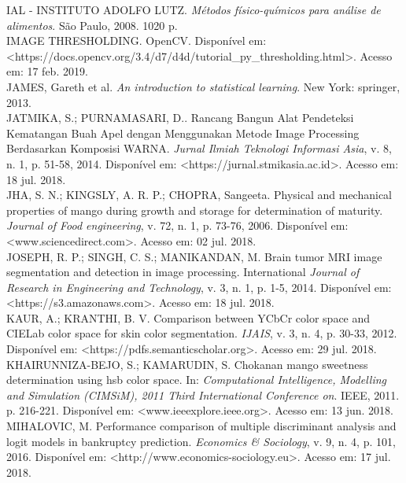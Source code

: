 \noindent IAL - INSTITUTO ADOLFO LUTZ. \textit{Métodos físico-químicos para análise de alimentos}. São Paulo, 2008. 1020 p.
\\

\noindent IMAGE THRESHOLDING. OpenCV. Disponível em: <https://docs.opencv.org/3.4/d7/d4d/tutorial\_py\_thresholding.html>. Acesso em: 17 feb. 2019.
\\

\noindent JAMES, Gareth et al. \textit{An introduction to statistical learning}. New York: springer, 2013.
\\

\noindent JATMIKA, S.; PURNAMASARI, D.. Rancang Bangun Alat Pendeteksi Kematangan Buah Apel dengan Menggunakan Metode Image Processing Berdasarkan Komposisi WARNA. \textit{Jurnal Ilmiah Teknologi Informasi Asia}, v. 8, n. 1, p. 51-58, 2014. Disponível em: <https://jurnal.stmikasia.ac.id>. Acesso em: 18 jul. 2018.
\\

\noindent JHA, S. N.; KINGSLY, A. R. P.; CHOPRA, Sangeeta. Physical and mechanical properties of mango during growth and storage for determination of maturity. \textit{Journal of Food engineering}, v. 72, n. 1, p. 73-76, 2006. Disponível em: <www.sciencedirect.com>. Acesso em: 02 jul. 2018.
\\

\noindent JOSEPH, R. P.; SINGH, C. S.; MANIKANDAN, M. Brain tumor MRI image segmentation and detection in image processing. International \textit{Journal of Research in Engineering and Technology}, v. 3, n. 1, p. 1-5, 2014. Disponível em: <https://s3.amazonaws.com>. Acesso em: 18 jul. 2018.
\\

\noindent KAUR, A.; KRANTHI, B. V. Comparison between YCbCr color space and CIELab color space for skin color segmentation. \textit{IJAIS}, v. 3, n. 4, p. 30-33, 2012. Disponível em: <https://pdfs.semanticscholar.org>. Acesso em: 29 jul. 2018.
\\

\noindent KHAIRUNNIZA-BEJO, S.; KAMARUDIN, S. Chokanan mango sweetness determination using hsb color space. In: \textit{Computational Intelligence, Modelling and Simulation (CIMSiM), 2011 Third International Conference on}. IEEE, 2011. p. 216-221. Disponível em: <www.ieeexplore.ieee.org>. Acesso em: 13 jun. 2018.
\\

\noindent MIHALOVIC, M. Performance comparison of multiple discriminant analysis and logit models in bankruptcy prediction. \textit{Economics \& Sociology}, v. 9, n. 4, p. 101, 2016. Disponível em: <http://www.economics-sociology.eu>. Acesso em: 17 jul. 2018.
\\

